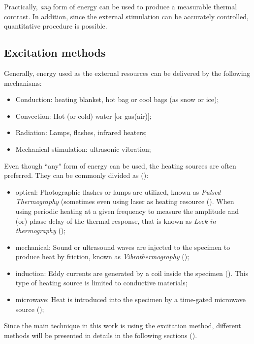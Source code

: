 Practically, \textit{any} form of energy can be used to produce a measurable thermal contrast. In addition, since the external stimulation can be accurately controlled, quantitative procedure is possible. 

\subsection*{Excitation methods}
Generally, energy used as the external resources can be delivered by the following mechanisms:
\begin{itemize}
	\item Conduction: heating blanket, hot bag or cool bags (as snow or ice);
	\item Convection: Hot (or cold) water [or gas(air)];
	\item Radiation: Lamps, flashes, infrared heaters;
	\item Mechanical stimulation: ultrasonic vibration;
\end{itemize}
Even though ``any" form of energy can be used, the heating sources are often preferred. They can be commonly divided as (\citet{ibarra2013infrared}):
\begin{itemize}
	\item optical: Photographic flashes or lamps are utilized, known as \textit{Pulsed Thermography} (sometimes even using laser as heating resource (\citet{suzuki2002application,burrows2007combined}). When using periodic heating at a given frequency to measure the amplitude and (or) phase delay  of the thermal response, that is known as \textit{Lock-in thermography} (\citet{wu1998lock,duan2013quantitative,2007-Ibarra-Castanedo});
	\item mechanical: Sound or ultrasound waves are injected to the specimen to produce heat by friction, known as \textit{Vibrothermography} (\citet{2007-ClementeIbarra-Castanedo,2007-Ibarra-Castanedo});
	\item induction: Eddy currents are generated by a coil inside the specimen (\citet{riegert2004lockin,zenzinger2007thermographic}). This type of heating source is limited to conductive materials;
	\item microwave: Heat is introduced into the specimen by a time-gated microwave source (\citet{myers1979microwave,land1987clinical});
\end{itemize}
Since the main technique in this work is using the excitation method, different methods will be presented in details in the following sections (\citet{Maldague2001theory,ibarra2013infrared}).
